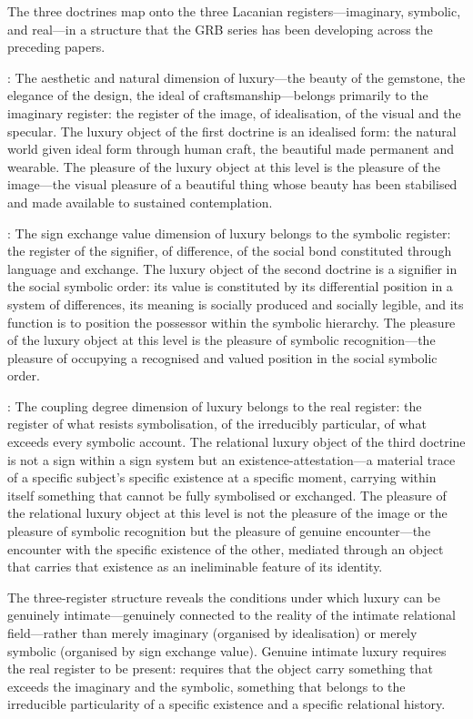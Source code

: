 \noindent
The three doctrines map onto the three Lacanian registers---imaginary, symbolic, and real---in a structure that the GRB series has been developing across the preceding papers.

: The aesthetic and natural dimension of luxury---the beauty of the gemstone, the elegance of the design, the ideal of craftsmanship---belongs primarily to the imaginary register: the register of the image, of idealisation, of the visual and the specular. The luxury object of the first doctrine is an idealised form: the natural world given ideal form through human craft, the beautiful made permanent and wearable. The pleasure of the luxury object at this level is the pleasure of the image---the visual pleasure of a beautiful thing whose beauty has been stabilised and made available to sustained contemplation.

: The sign exchange value dimension of luxury belongs to the symbolic register: the register of the signifier, of difference, of the social bond constituted through language and exchange. The luxury object of the second doctrine is a signifier in the social symbolic order: its value is constituted by its differential position in a system of differences, its meaning is socially produced and socially legible, and its function is to position the possessor within the symbolic hierarchy. The pleasure of the luxury object at this level is the pleasure of symbolic recognition---the pleasure of occupying a recognised and valued position in the social symbolic order.

: The coupling degree dimension of luxury belongs to the real register: the register of what resists symbolisation, of the irreducibly particular, of what exceeds every symbolic account. The relational luxury object of the third doctrine is not a sign within a sign system but an existence-attestation---a material trace of a specific subject's specific existence at a specific moment, carrying within itself something that cannot be fully symbolised or exchanged. The pleasure of the relational luxury object at this level is not the pleasure of the image or the pleasure of symbolic recognition but the pleasure of genuine encounter---the encounter with the specific existence of the other, mediated through an object that carries that existence as an ineliminable feature of its identity.

The three-register structure reveals the conditions under which luxury can be genuinely intimate---genuinely connected to the reality of the intimate relational field---rather than merely imaginary (organised by idealisation) or merely symbolic (organised by sign exchange value). Genuine intimate luxury requires the real register to be present: requires that the object carry something that exceeds the imaginary and the symbolic, something that belongs to the irreducible particularity of a specific existence and a specific relational history.

